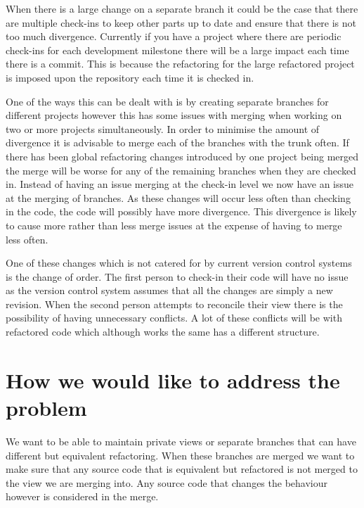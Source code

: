 
When there is a large change on a separate branch it could be the case that there are multiple check-ins to keep other parts up to date and ensure that there is not too much divergence.  Currently if you have a project where there are periodic check-ins for each development milestone there will be a large impact each time there is a commit. This is because the refactoring for the large refactored project is imposed upon the repository each time it is checked in.

One of the ways this can be dealt with is by creating separate branches for different projects however this has some issues with merging when working on two or more projects simultaneously.  In order to minimise the amount of divergence it is advisable to merge each of the branches with the trunk often.  If there has been global refactoring changes introduced by one project being merged the merge will be worse for any of the remaining branches when they are checked in.  Instead of having an issue merging at the check-in level we now have an issue at the merging of branches.  As these changes will occur less often than checking in the code, the code will possibly have more divergence.  This divergence is likely to cause more rather than less merge issues at the expense of having to merge less often.


One of these changes which is not catered for by current version control systems is the change of order.  The first person to check-in their code will have no issue as the version control system assumes that all the changes are simply a new revision.  When the second person attempts to reconcile their view there is the possibility of having unnecessary conflicts.  A lot of these conflicts will be with refactored code which although works the same has a different structure.

\section{How we would like to address the problem}
We want to be able to maintain private views or separate branches that can have different but equivalent refactoring.  When these branches are merged we want to make sure that any source code that is equivalent but refactored is not merged to the view we are merging into. Any source code that changes the behaviour however is considered in the merge.

